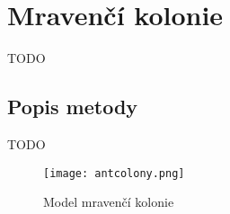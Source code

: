 \section{Mravenčí kolonie}
TODO
\subsection{Popis metody}
TODO

\begin{figure}[H]
	\texttt{[image: antcolony.png]}
	\centering
	\caption{Model mravenčí kolonie}
\end{figure}